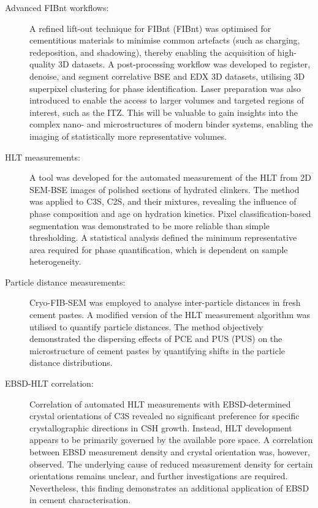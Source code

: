 \begin{description}
    \item[Advanced \ac{FIBnt} workflows:]
    A refined lift-out technique for \acl{FIBnt} (\acs{FIBnt}) was optimised for cementitious materials to minimise common artefacts (such as charging, redeposition, and shadowing), thereby enabling the acquisition of high-quality 3D datasets.
    A post-processing workflow was developed to register, denoise, and segment correlative \ac{BSE} and \ac{EDX} 3D datasets, utilising 3D superpixel clustering for phase identification.
    Laser preparation was also introduced to enable the access to larger volumes and targeted regions of interest, such as the \ac{ITZ}.
    This will be valuable to gain insights into the complex nano- and microstructures of modern binder systems, enabling the imaging of statistically more representative volumes.

    \item[\ac{HLT} measurements:]
    A tool was developed for the automated measurement of the \ac{HLT} from 2D \ac{SEM}-\ac{BSE} images of polished sections of hydrated clinkers.
    The method was applied to \ac{C3S}, \ac{C2S}, and their mixtures, revealing the influence of phase composition and age on hydration kinetics.
    Pixel classification-based segmentation was demonstrated to be more reliable than simple thresholding.
    A statistical analysis defined the minimum representative area required for phase quantification, which is dependent on sample heterogeneity.

    \item[Particle distance measurements:]
    Cryo-\acs{FIB}-\ac{SEM} was employed to analyse inter-par\-ti\-cle distances in fresh cement pastes.
    A modified version of the \ac{HLT} measurement algorithm was utilised to quantify particle distances.
    The method objectively demonstrated the dispersing effects of \acl{PCE} and \acl{PUS} (\acs{PUS}) on the microstructure of cement pastes by quantifying shifts in the particle distance distributions.

    \item[\ac{EBSD}-\ac{HLT} correlation:]
    Correlation of automated \ac{HLT} measurements with \ac{EBSD}-determined crystal orientations of \ac{C3S} revealed no significant preference for specific crystallographic directions in \ac{CSH} growth.
    Instead, \ac{HLT} development appears to be primarily governed by the available pore space.
    A correlation between \ac{EBSD} measurement density and crystal orientation was, however, observed.
    The underlying cause of reduced measurement density for certain orientations remains unclear, and further investigations are required.
    Nevertheless, this finding demonstrates an additional application of \ac{EBSD} in cement characterisation.


\end{description}
